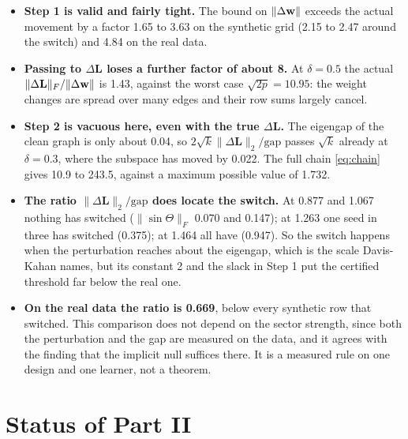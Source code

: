\documentclass[11pt,a4paper]{article}
\newcommand{\Lap}{\mathbf{L}}
\theoremstyle{remark}
\begin{document}
\begin{itemize}
\item \textbf{Step 1 is valid and fairly tight.} The bound on $\lVert\Delta\mathbf w\rVert$
  exceeds the actual movement by a factor 1.65 to 3.63 on the synthetic grid (2.15 to
  2.47 around the switch) and 4.84 on the real data.
\item \textbf{Passing to $\Delta\Lap$ loses a further factor of about 8.} At
  $\delta=0.5$ the actual $\lVert\Delta\Lap\rVert_F/\lVert\Delta\wvec\rVert$ is 1.43,
  against the worst case $\sqrt{2p}=10.95$: the weight changes are spread over many
  edges and their row sums largely cancel.
\item \textbf{Step 2 is vacuous here, even with the true $\Delta\Lap$.} The eigengap of
  the clean graph is only about 0.04, so $2\sqrt k\lVert\Delta\Lap\rVert_2/\mathrm{gap}$
  passes $\sqrt k$ already at $\delta=0.3$, where the subspace has moved by 0.022.
  The full chain \eqref{eq:chain} gives 10.9 to 243.5, against a maximum possible
  value of 1.732.
\item \textbf{The ratio $\lVert\Delta\Lap\rVert_2/\mathrm{gap}$ does locate the switch.}
  At 0.877 and 1.067 nothing has switched ($\lVert\sin\Theta\rVert_F$ 0.070 and
  0.147); at 1.263 one seed in three has switched (0.375); at 1.464 all have (0.947).
  So the switch happens when the perturbation reaches about the eigengap, which is the
  scale Davis-Kahan names, but its constant 2 and the slack in Step 1 put the
  certified threshold far below the real one.
\item \textbf{On the real data the ratio is 0.669}, below every synthetic row that
  switched. This comparison does not depend on the sector strength, since both the
  perturbation and the gap are measured on the data, and it agrees with the finding
  that the implicit null suffices there. It is a measured rule on one design and one
  learner, not a theorem.
\end{itemize}

\section{Status of Part II}\label{sec:status2}
\end{document}
